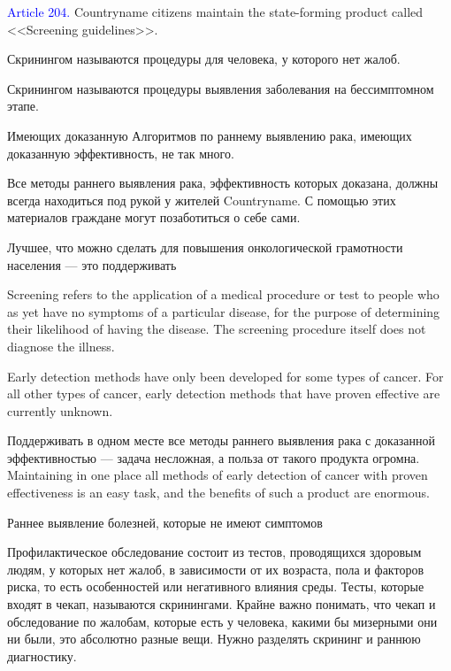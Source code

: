 \documentclass[11pt]{article}
\theoremstyle{remark}
\theoremstyle{definition}
\begin{document}
\color{black}





\textcolor{blue}{Article 204.} Countryname citizens maintain the state-forming product called <<Screening guidelines>>.

\color{blue}

Скринингом называются процедуры для человека, у которого нет жалоб.

Скринингом называются процедуры выявления заболевания на бессимптомном этапе.

Имеющих доказанную Алгоритмов по раннему выявлению рака, имеющих доказанную эффективность, не так много.

Все методы раннего выявления рака, эффективность которых доказана, должны всегда находиться под рукой у жителей Countryname. С помощью этих материалов граждане могут позаботиться о себе сами.

Лучшее, что можно сделать для повышения онкологической грамотности населения --- это поддерживать 


Screening refers to the application of a medical procedure or test to people who as yet have no symptoms of a particular disease, for the purpose of determining their likelihood of having the disease. The screening procedure itself does not diagnose the illness.


Early detection methods have only been developed for some types of cancer. For all other types of cancer, early detection methods that have proven effective are currently unknown.


Поддерживать в одном месте все методы раннего выявления рака с доказанной эффективностью --- задача несложная, а польза от такого продукта огромна. Maintaining in one place all methods of early detection of cancer with proven effectiveness is an easy task, and the benefits of such a product are enormous.


Раннее выявление болезней, которые не имеют симптомов

Профилактическое обследование состоит из тестов, проводящихся здоровым людям, у которых нет жалоб, в зависимости от их возраста, пола и факторов риска, то есть особенностей или негативного влияния среды. Тесты, которые входят в чекап, называются скринингами. Крайне важно понимать, что чекап и обследование по жалобам, которые есть у человека, какими бы мизерными они ни были, это абсолютно разные вещи. Нужно разделять скрининг и раннюю диагностику. 
\end{document}
